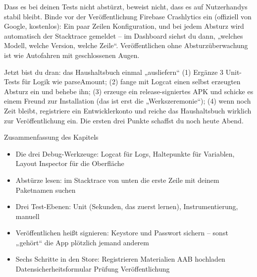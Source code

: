 
Dass es bei deinen Tests nicht abstürzt, beweist nicht, dass es auf Nutzerhandys stabil bleibt. Binde vor der Veröffentlichung Firebase Crashlytics ein (offiziell von Google, kostenlos): Ein paar Zeilen Konfiguration, und bei jedem Absturz wird automatisch der Stacktrace gemeldet – im Dashboard siehst du dann, „welches Modell, welche Version, welche Zeile“. Veröffentlichen ohne Absturzüberwachung ist wie Autofahren mit geschlossenen Augen.

\begin{tcbpractice}{Jetzt bist du dran: das Haushaltsbuch einmal „ausliefern“}
(1) Ergänze 3 Unit-Tests für Logik wie parseAmount; (2) fange mit Logcat einen selbst erzeugten Absturz ein und behebe ihn; (3) erzeuge ein release-signiertes APK und schicke es einem Freund zur Installation (das ist erst die „Werkszeremonie“); (4) wenn noch Zeit bleibt, registriere ein Entwicklerkonto und reiche das Haushaltsbuch wirklich zur Veröffentlichung ein. Die ersten drei Punkte schaffst du noch heute Abend.

\end{tcbpractice}

\begin{tcbsummary}{Zusammenfassung des Kapitels}
\begin{itemize}
  \item Die drei Debug-Werkzeuge: Logcat für Logs, Haltepunkte für Variablen, Layout Inspector für die Oberfläche
  \item Abstürze lesen: im Stacktrace von unten die erste Zeile mit deinem Paketnamen suchen
  \item Drei Test-Ebenen: Unit (Sekunden, das zuerst lernen), Instrumentierung, manuell
  \item Veröffentlichen heißt signieren: Keystore und Passwort sichern – sonst „gehört“ die App plötzlich jemand anderem
  \item Sechs Schritte in den Store: Registrieren Materialien AAB hochladen Datensicherheitsformular Prüfung Veröffentlichung
\end{itemize}

\end{tcbsummary}
